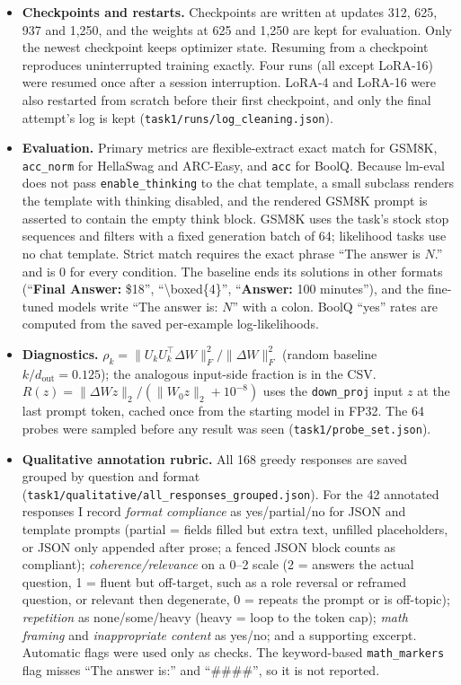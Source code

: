 \documentclass{article}
\begin{document}
\begin{itemize}
\item \textbf{Checkpoints and restarts.} Checkpoints are written at updates 312, 625, 937 and 1{,}250, and the weights at 625 and 1{,}250 are kept for evaluation. Only the newest checkpoint keeps optimizer state. Resuming from a checkpoint reproduces uninterrupted training exactly. Four runs (all except LoRA-16) were resumed once after a session interruption. LoRA-4 and LoRA-16 were also restarted from scratch before their first checkpoint, and only the final attempt's log is kept (\texttt{task1/runs/log\_cleaning.json}).
\item \textbf{Evaluation.} Primary metrics are flexible-extract exact match for GSM8K, \texttt{acc\_norm} for HellaSwag and ARC-Easy, and \texttt{acc} for BoolQ. Because lm-eval does not pass \texttt{enable\_thinking} to the chat template, a small subclass renders the template with thinking disabled, and the rendered GSM8K prompt is asserted to contain the empty think block. GSM8K uses the task's stock stop sequences and filters with a fixed generation batch of 64; likelihood tasks use no chat template. Strict match requires the exact phrase ``The answer is $N$.'' and is 0 for every condition. The baseline ends its solutions in other formats (``\textbf{Final Answer:} \$18'', ``\textbackslash boxed\{4\}'', ``\textbf{Answer:} 100 minutes''), and the fine-tuned models write ``The answer is: $N$'' with a colon. BoolQ ``yes'' rates are computed from the saved per-example log-likelihoods.
\item \textbf{Diagnostics.} $\rho_k=\|U_kU_k^\top\Delta W\|_F^2/\|\Delta W\|_F^2$ (random baseline $k/d_{\text{out}}=0.125$); the analogous input-side fraction is in the CSV. $R(z)=\|\Delta W z\|_2/(\|W_0z\|_2+10^{-8})$ uses the \texttt{down\_proj} input $z$ at the last prompt token, cached once from the starting model in FP32. The 64 probes were sampled before any result was seen (\texttt{task1/probe\_set.json}).
\item \textbf{Qualitative annotation rubric.} All 168 greedy responses are saved grouped by question and format (\texttt{task1/qualitative/all\_responses\_grouped.json}). For the 42 annotated responses I record \emph{format compliance} as yes/partial/no for JSON and template prompts (partial = fields filled but extra text, unfilled placeholders, or JSON only appended after prose; a fenced JSON block counts as compliant); \emph{coherence/relevance} on a 0--2 scale (2 = answers the actual question, 1 = fluent but off-target, such as a role reversal or reframed question, or relevant then degenerate, 0 = repeats the prompt or is off-topic); \emph{repetition} as none/some/heavy (heavy = loop to the token cap); \emph{math framing} and \emph{inappropriate content} as yes/no; and a supporting excerpt. Automatic flags were used only as checks. The keyword-based \texttt{math\_markers} flag misses ``The answer is:'' and ``\#\#\#\#'', so it is not reported.
\end{itemize}
\end{document}
